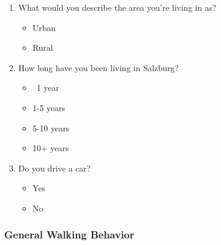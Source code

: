 \begin{enumerate}
    \item What would you describe the area you’re living in as?
    \begin{itemize}
        \item Urban
        \item Rural
    \end{itemize}
    
    \item How long have you been living in Salzburg?
    \begin{itemize}
        \item ~1 year
        \item 1-5 years
        \item 5-10 years
        \item 10+ years
    \end{itemize}
    
    \item Do you drive a car?
    \begin{itemize}
        \item Yes
        \item No
    \end{itemize}
    \setcounter{surveyCounter}{\value{enumi}}
\end{enumerate}


\subsubsection{General Walking Behavior}

